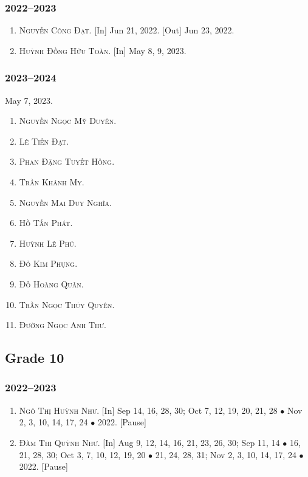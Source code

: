 \documentclass{article}
\begin{document}
\subsubsection{2022--2023}

\begin{enumerate}
	\item \textsc{Nguyễn Công Đạt.} \textsf{[In]} Jun 21, 2022. \textsf{[Out]} Jun 23, 2022.
	\item \textsc{Huỳnh Đồng Hữu Toàn.} \textsf{[In]} May 8, 9, 2023.
\end{enumerate}

\subsubsection{2023--2024}
May 7, 2023.
\begin{enumerate}
	\item \textsc{Nguyễn Ngọc Mỹ Duyên.}
	\item \textsc{Lê Tiến Đạt.}
	\item \textsc{Phan Đặng Tuyết Hồng.}
	\item \textsc{Trần Khánh My.}
	\item \textsc{Nguyễn Mai Duy Nghĩa.}
	\item \textsc{Hồ Tấn Phát.}
	\item \textsc{Huỳnh Lê Phú.}
	\item \textsc{Đỗ Kim Phụng.}
	\item \textsc{Đỗ Hoàng Quân.}
	\item \textsc{Trần Ngọc Thúy Quyên.} 
	\item \textsc{Đường Ngọc Anh Thư.}
\end{enumerate}


\subsection{Grade 10}

\subsubsection{2022--2023}

\begin{enumerate}
	\item \textsc{Ngô Thị Huỳnh Như.} \textsf{[In]} Sep 14, 16, 28, 30; Oct 7, 12, 19, 20, 21, 28 $\bullet$ Nov 2, 3, 10, 14, 17, 24 $\bullet$ 2022. \textsf{[Pause]}
	\item \textsc{Đàm Thị Quỳnh Như.} \textsf{[In]} Aug 9, 12, 14, 16, 21, 23, 26, 30; Sep 11, 14 $\bullet$ 16, 21, 28, 30; Oct 3, 7, 10, 12, 19, 20 $\bullet$ 21, 24, 28, 31; Nov 2, 3, 10, 14, 17, 24 $\bullet$ 2022. \textsf{[Pause]}
\end{enumerate}
\end{document}
